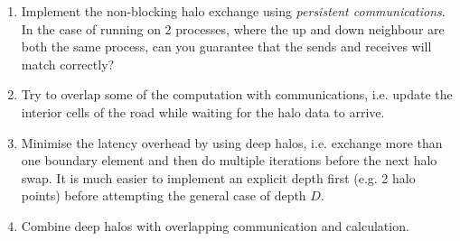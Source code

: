 \documentclass{article}
\begin{document}
\begin{enumerate}
\item Implement the non-blocking halo exchange using {\em persistent
  communications}. In the case of running on 2 processes, where the up
  and down neighbour are both the same process, can you guarantee that
  the sends and receives will match correctly?

\item Try to overlap some of the computation with communications,
  i.e. update the interior cells of the road while waiting for the
  halo data to arrive.

\item Minimise the latency overhead by using deep halos, i.e. exchange
  more than one boundary element and then do multiple iterations
  before the next halo swap. It is much easier to implement an
  explicit depth first (e.g. 2 halo points) before attempting the
  general case of depth $D$.

\item Combine deep halos with overlapping communication and calculation.



\end{enumerate}
\end{document}

